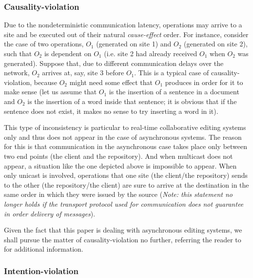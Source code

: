 \subsubsection{Causality-violation}

Due to the nondeterministic communication latency, operations may arrive to a site
and be executed out of their natural \emph{cause-effect} order. For instance, consider
the case of two operations, $O_{1}$ (generated on site 1) and $O_{2}$
(generated on site 2), such that $O_{2}$ is dependent on $O_{1}$ (i.e. site 2 had already
received $O_{1}$ when $O_{2}$ was generated). Suppose that, due to different communication
delays over the network, $O_{2}$ arrives at, say, site 3 before $O_{1}$. This is a typical
case of causality-violation, because $O_{2}$ might need some effect that $O_{1}$ produces in
order for it to make sense (let us assume that $O_{1}$ is the insertion of a sentence
in a document and $O_{2}$ is the insertion of a word inside that sentence; it is obvious
that if the sentence does not exist, it makes no sense to try inserting a word in
it).

This type of inconsistency is particular to real-time collaborative editing systems
only and thus does not appear in the case of asynchronous systems. The reason for
this is that communication in the asynchronous case takes place only between
two end points (the client and the repository). And when multicast does not appear,
a situation like the one depicted above is impossible to appear. When only unicast
is involved, operations that one site (the client/the repository) sends to the other
(the repository/the client) are sure to arrive at the destination in the same order
in which they were issued by the source (\emph{Note: this statement no longer holds
if the transport protocol used for communication does not guarantee in order delivery
of messages}).

Given the fact that this paper is dealing with asynchronous editing systems, we
shall pursue the matter of causality-violation no further, referring the reader to
\cite{sun96} for additional information. 

\subsubsection{Intention-violation}

